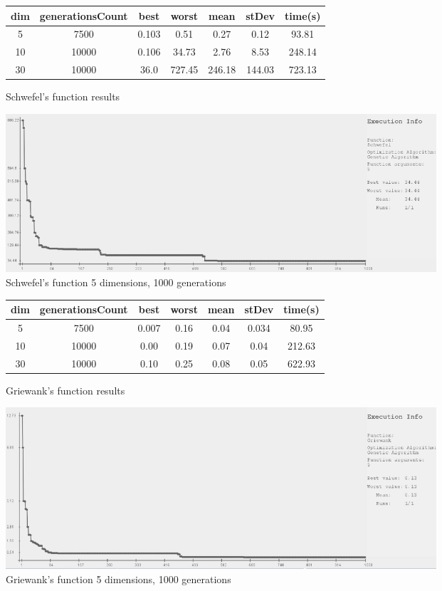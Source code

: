 \documentclass[a4paper]{article}
\begin{document}
	\begin{figure}[!h]
		\centering
		\begin{tabular}{|| c | c | c | c | c | c | c ||}
			\hline
			dim & generationsCount & best & worst & mean & stDev & time(s) \\ \hline \hline
			5 & 7500 & 0.103 & 0.51 & 0.27 & 0.12 & 93.81 \\ \hline
			10 & 10000 & 0.106 & 34.73 & 2.76 & 8.53 & 248.14 \\ \hline
			30 & 10000 & 36.0 & 727.45 & 246.18 & 144.03 & 723.13 \\ \hline
		\end{tabular}
		\caption{Schwefel's function results}
	\end{figure}
	
	\begin{figure}[h]
		\centering
		\includegraphics[width=16cm]{schwefel_5_1000.JPG}
		\caption{Schwefel's function 5 dimensions, 1000 generations}
	\end{figure}
	
	\begin{figure}[!h]
		\centering
		\begin{tabular}{|| c | c | c | c | c | c | c ||}
			\hline
			dim & generationsCount & best & worst & mean & stDev & time(s) \\ \hline \hline
			5 & 7500 & 0.007 & 0.16 & 0.04 & 0.034 & 80.95 \\ \hline
			10 & 10000 & 0.00 & 0.19 & 0.07 & 0.04 & 212.63 \\ \hline
			30 & 10000 & 0.10 & 0.25 & 0.08 & 0.05 & 622.93 \\ \hline
		\end{tabular}
		\caption{Griewank's function results}
	\end{figure}
	
	\begin{figure}[!h]
		\centering
		\includegraphics[width=16cm]{griewank_5_1000.JPG}
		\caption{Griewank's function 5 dimensions, 1000 generations}
	\end{figure}
	
\end{document}
